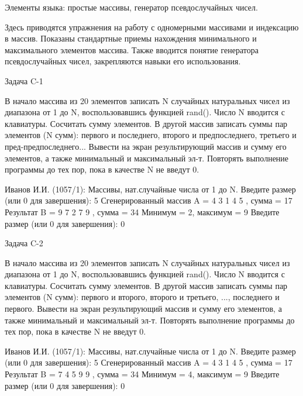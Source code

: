 
Элементы языка: простые массивы, генератор псевдослучайных чисел.

Здесь приводятся упражнения на работу с одномерными массивами и индексацию в
массив. Показаны стандартные приемы нахождения минимального и максимального
элементов массива. Также вводится понятие генератора псевдослучайных чисел,
закрепляются навыки его использования.



Задача C-1

В начало массива из 20 элементов записать N случайных натуральных чисел из
диапазона от 1 до N, воспользовавшись функцией rand(). Число N вводится с
клавиатуры. Сосчитать сумму элементов. В другой массив записать суммы пар
элементов (N сумм): первого и последнего, второго и предпоследнего, третьего и
пред-предпоследнего... Вывести на экран результирующий массив и сумму его
элементов, а также минимальный и максимальный эл-т. Повторять выполнение
программы до тех пор, пока в качестве N не введут 0.

Иванов И.И. (1057/1): Массивы, нат.случайные числа от 1 до N.
Введите размер (или 0 для завершения): 5
Сгенерированный массив A = { 4 3 1 4 5 }, сумма = 17
Результат B = { 9 7 2 7 9 }, сумма = 34
Минимум = 2, максимум = 9
Введите размер (или 0 для завершения): 0


Задача C-2

В начало массива из 20 элементов записать N случайных натуральных чисел из
диапазона от 1 до N, воспользовавшись функцией rand(). Число N вводится с
клавиатуры. Сосчитать сумму элементов. В другой массив записать суммы пар
элементов (N сумм): первого и второго, второго и третьего, ..., последнего и
первого. Вывести на экран результирующий массив и сумму его элементов, а также
минимальный и максимальный эл-т. Повторять выполнение программы до тех пор,
пока в качестве N не введут 0.

Иванов И.И. (1057/1): Массивы, нат.случайные числа от 1 до N.
Введите размер (или 0 для завершения): 5
Сгенерированный массив A = { 4 3 1 4 5 }, сумма = 17
Результат B = { 7 4 5 9 9 }, сумма = 34
Минимум = 4, максимум = 9
Введите размер (или 0 для завершения): 0

